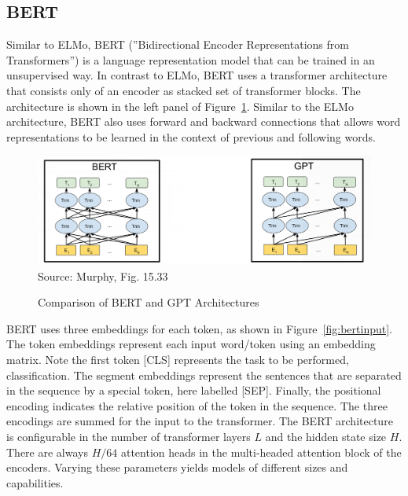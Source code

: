 \subsection*{BERT}

Similar to ELMo, BERT (''Bidirectional Encoder Representations from Transformers'') is a language representation model that can be trained in an unsupervised way. In contrast to ELMo, BERT uses a transformer architecture that consists only of an encoder as stacked set of transformer blocks. The architecture is shown in the left panel of Figure~\ref{fig:bert}. Similar to the ELMo architecture, BERT also uses forward and backward connections that allows word representations to be learned in the context of previous and following words. 

\begin{figure}
\centering
\includegraphics[width=\textwidth]{murphy_15_33.png} \\

\scriptsize Source: Murphy, Fig. 15.33 \normalsize
\caption{Comparison of BERT and GPT Architectures}
\label{fig:bert}
\end{figure}

BERT uses three embeddings for each token, as shown in Figure~\ref{fig:bertinput}. The token embeddings represent each input word/token using an embedding matrix. Note the first token [CLS] represents the task to be performed, classification. The segment embeddings represent the sentences that are separated in the sequence by a special token, here labelled [SEP]. Finally, the positional encoding indicates the relative position of the token in the sequence. The three encodings are summed for the input to the transformer. The BERT architecture is configurable in the number of transformer layers $L$ and the hidden state size $H$. There are always $H/64$ attention heads in the multi-headed attention block of the encoders. Varying these parameters yields models of different sizes and capabilities. 

